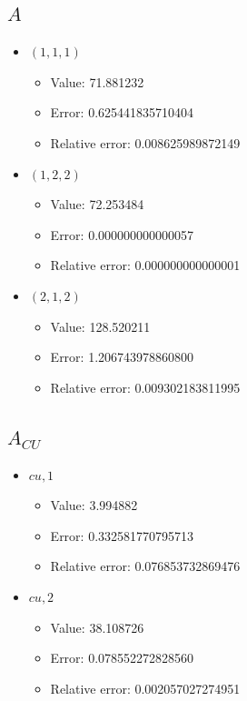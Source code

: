 \documentclass{article}%
\begin{document}
\subsection{$A$}%
\begin{itemize}%
	\item $(1, 1, 1)$%
	\begin{itemize}%
		\item Value: 71.881232%
		\item Error: 0.625441835710404%
		\item Relative error: 0.008625989872149%
	\end{itemize}%
	\item $(1, 2, 2)$%
	\begin{itemize}%
		\item Value: 72.253484%
		\item Error: 0.000000000000057%
		\item Relative error: 0.000000000000001%
	\end{itemize}%
	\item $(2, 1, 2)$%
	\begin{itemize}%
		\item Value: 128.520211%
		\item Error: 1.206743978860800%
		\item Relative error: 0.009302183811995%
	\end{itemize}%
\end{itemize}%
\subsection{$A_{CU}$}%
\begin{itemize}%
	\item $\textit{cu},1$%
	\begin{itemize}%
		\item Value: 3.994882%
		\item Error: 0.332581770795713%
		\item Relative error: 0.076853732869476%
	\end{itemize}%
	\item $\textit{cu},2$%
	\begin{itemize}%
		\item Value: 38.108726%
		\item Error: 0.078552272828560%
		\item Relative error: 0.002057027274951%
	\end{itemize}%
\end{itemize}%
\end{document}
